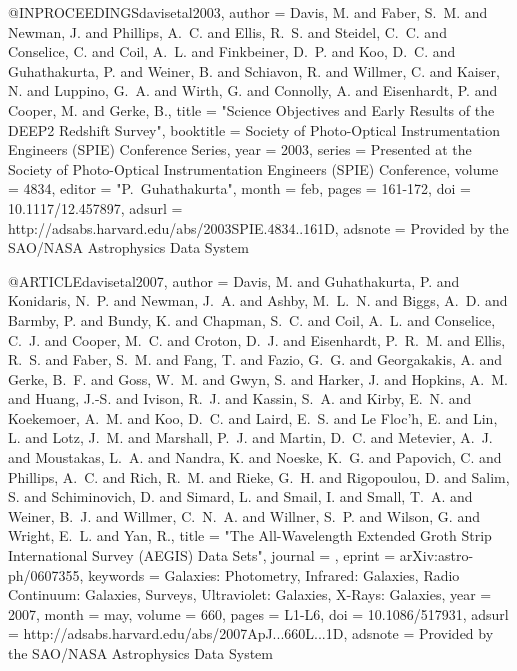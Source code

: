 {{{{{{{{{{{{{{{@INPROCEEDINGS{davisetal2003,
   author = {{Davis}, M. and {Faber}, S.~M. and {Newman}, J. and {Phillips}, A.~C. and 
	{Ellis}, R.~S. and {Steidel}, C.~C. and {Conselice}, C. and 
	{Coil}, A.~L. and {Finkbeiner}, D.~P. and {Koo}, D.~C. and {Guhathakurta}, P. and 
	{Weiner}, B. and {Schiavon}, R. and {Willmer}, C. and {Kaiser}, N. and 
	{Luppino}, G.~A. and {Wirth}, G. and {Connolly}, A. and {Eisenhardt}, P. and 
	{Cooper}, M. and {Gerke}, B.},
    title = "{Science Objectives and Early Results of the DEEP2 Redshift Survey}",
booktitle = {Society of Photo-Optical Instrumentation Engineers (SPIE) Conference Series},
     year = 2003,
   series = {Presented at the Society of Photo-Optical Instrumentation Engineers (SPIE) Conference},
   volume = 4834,
   editor = "{P.~Guhathakurta}",
    month = feb,
    pages = {161-172},
      doi = {10.1117/12.457897},
   adsurl = {http://adsabs.harvard.edu/abs/2003SPIE.4834..161D},
  adsnote = {Provided by the SAO/NASA Astrophysics Data System}
}


@ARTICLE{davisetal2007,
   author = {{Davis}, M. and {Guhathakurta}, P. and {Konidaris}, N.~P. and 
	{Newman}, J.~A. and {Ashby}, M.~L.~N. and {Biggs}, A.~D. and 
	{Barmby}, P. and {Bundy}, K. and {Chapman}, S.~C. and {Coil}, A.~L. and 
	{Conselice}, C.~J. and {Cooper}, M.~C. and {Croton}, D.~J. and 
	{Eisenhardt}, P.~R.~M. and {Ellis}, R.~S. and {Faber}, S.~M. and 
	{Fang}, T. and {Fazio}, G.~G. and {Georgakakis}, A. and {Gerke}, B.~F. and 
	{Goss}, W.~M. and {Gwyn}, S. and {Harker}, J. and {Hopkins}, A.~M. and 
	{Huang}, J.-S. and {Ivison}, R.~J. and {Kassin}, S.~A. and {Kirby}, E.~N. and 
	{Koekemoer}, A.~M. and {Koo}, D.~C. and {Laird}, E.~S. and {Le Floc'h}, E. and 
	{Lin}, L. and {Lotz}, J.~M. and {Marshall}, P.~J. and {Martin}, D.~C. and 
	{Metevier}, A.~J. and {Moustakas}, L.~A. and {Nandra}, K. and 
	{Noeske}, K.~G. and {Papovich}, C. and {Phillips}, A.~C. and 
	{Rich}, R.~M. and {Rieke}, G.~H. and {Rigopoulou}, D. and {Salim}, S. and 
	{Schiminovich}, D. and {Simard}, L. and {Smail}, I. and {Small}, T.~A. and 
	{Weiner}, B.~J. and {Willmer}, C.~N.~A. and {Willner}, S.~P. and 
	{Wilson}, G. and {Wright}, E.~L. and {Yan}, R.},
    title = "{The All-Wavelength Extended Groth Strip International Survey (AEGIS) Data Sets}",
  journal = {\apjl},
   eprint = {arXiv:astro-ph/0607355},
 keywords = {Galaxies: Photometry, Infrared: Galaxies, Radio Continuum: Galaxies, Surveys, Ultraviolet: Galaxies, X-Rays: Galaxies},
     year = 2007,
    month = may,
   volume = 660,
    pages = {L1-L6},
      doi = {10.1086/517931},
   adsurl = {http://adsabs.harvard.edu/abs/2007ApJ...660L...1D},
  adsnote = {Provided by the SAO/NASA Astrophysics Data System}
}

}}}}}}}}}}}}}}}
